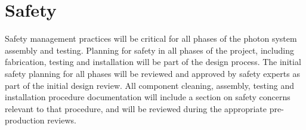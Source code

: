 \section{Safety}
\label{sec:fdsp-pd-safety}

Safety management practices will be critical for all phases of the photon system assembly and testing.  Planning for safety in all phases of the project, including fabrication, testing and installation will be part of the design process.  The initial safety planning for all phases will be reviewed and approved by safety experts as part of the initial design review.  All component cleaning, assembly, testing  and installation procedure documentation will include a section on safety concerns relevant to that procedure, and will be reviewed during the appropriate pre-production reviews.

